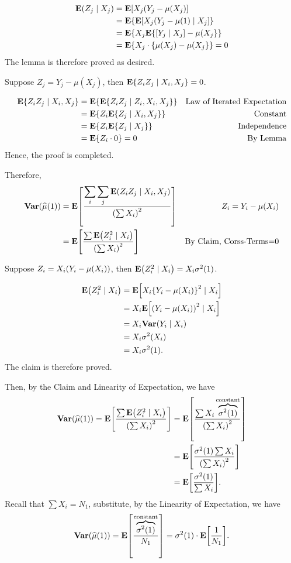 \begin{prf}
\begin{lem*}
\begin{prf*}
			\begin{align*}
				\vb{E}(Z_j\mid X_j)&=\vb{E}\qty[X_j(Y_j-\mu(X_j)]\\
				&=\vb{E}\qty{\vb{E}\qty[X_j(Y_j-\mu(1)\mid X_j]}\\
				&=\vb{E}\qty{X_j\vb{E}\qty{[Y_j\mid X_j]-\mu(X_j}}\\
				&=\vb{E}\qty{X_j\cdot\qty{\mu(X_j)-\mu(X_j}}=0
			\end{align*}
		The lemma is therefore proved as desired.
	\end{prf*}	
	\end{lem*}
	\begin{clm*}
		Suppose $Z_j=Y_j-\mu(X_j)$, then $\vb{E}\qty{Z_iZ_j\mid X_i,X_j}=0$.
	\begin{prf*}
		\begin{align*}
			\vb{E}\qty{Z_iZ_j\mid X_i,X_j}&=\vb{E}\qty{\vb{E}\qty{Z_iZ_j\mid Z_i,X_i,X_j}}&\text{Law of Iterated Expectation}\\
			&=\vb{E}\qty{Z_i\vb{E}\qty{Z_j\mid X_i,X_j}}&\text{Constant}\\
			&=\vb{E}\qty{Z_i\vb{E}\qty{Z_j\mid X_j}}&\text{Independence}\\
			&=\vb{E}\qty{Z_i\cdot0}=0&\text{By Lemma}
		\end{align*}
		Hence, the proof is completed. 
	\end{prf*}
	\end{clm*}
	Therefore, 
	\begin{align*}
		\vb{Var}\qty(\widehat\mu(1)) &=\vb{E}\qty[\dfrac{\displaystyle\sum_i\sum_j\vb{E}\qty(Z_iZ_j\mid X_i,X_j)}{\qty(\sum X_i)^2}]&Z_i=Y_i-\mu(X_i)\\
		&=\vb{E}\qty[\dfrac{\sum\vb{E}\qty(Z_i^2\mid X_i)}{\qty(\sum X_i)^2}]&\text{By Claim, Corss-Terms=0}
	\end{align*}
	\begin{clm*}
		Suppose $Z_i=X_i\qty(Y_i-\mu(X_i))$, then $\vb{E}\qty(Z_i^2\mid X_i)=X_i\sigma^2(1)$.
		\begin{prf*}
			\begin{align*}
				\vb{E}\qty(Z_i^2\mid X_i)&=\vb{E}\qty[X_i\qty{Y_i-\mu(X_i)}^2\mid X_i]\\
				&=X_i\vb{E}\qty[\qty(Y_i-\mu(X_i))^2\mid X_i]\\
				&=X_i\vb{Var}\qty(Y_i\mid X_i)\\
				&=X_i\sigma^2\qty(X_i)\\
				&=X_i\sigma^2(1).
			\end{align*}
			The claim is therefore proved.
		\end{prf*}
	\end{clm*}
	Then, by the Claim and Linearity of Expectation, we have \begin{align*}
		\vb{Var}\qty(\widehat\mu(1))=\vb{E}\qty[\dfrac{\sum\vb{E}\qty(Z_i^2\mid X_i)}{\qty(\sum X_i)^2}]&=\vb{E}\qty[\dfrac{\sum X_i\overbrace{\sigma^2(1)}^\text{constant}}{\qty(\sum X_i)^2}]\\
		&=\vb{E}\qty[\dfrac{\sigma^2(1)\sum X_i}{\qty(\sum X_i)^2}]\\
		&=\vb{E}\qty[\dfrac{\sigma^2(1)}{\sum X_i}].
	\end{align*}
	Recall that $\sum X_i=N_1$, substitute, by the Linearity of Expectation, we have \[\vb{Var}\qty(\widehat\mu(1))=\vb{E}\qty[\dfrac{\overbrace{\sigma^2(1)}^\text{constant}}{N_1}]=\sigma^2(1)\cdot\vb{E}\qty[\dfrac{1}{N_1}].\]
\end{prf}

